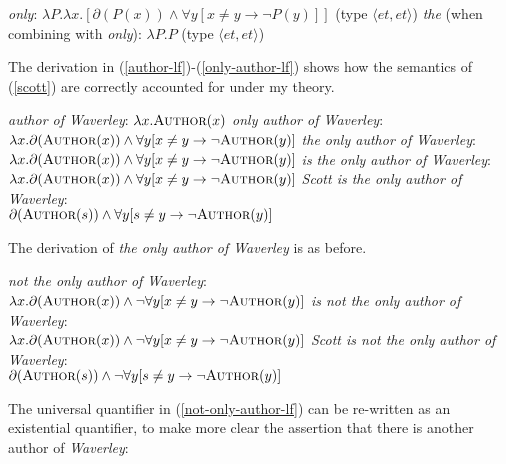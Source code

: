 \begin{exe}
	\ex \label{only-lf} \textit{only}: $ \lambda P . \lambda x . [ \partial(P(x)) \land \forall y [ x \ne y \to \neg P(y) ] ] $ (type $\langle et, et \rangle$)
	\ex \textit{the} (when combining with \textit{only}): $\lambda P . P$ (type $\langle et, et \rangle$)
\end{exe}

The derivation in (\ref{author-lf})-(\ref{only-author-lf}) shows how the semantics of (\ref{scott}) are correctly accounted for under my theory.

\begin{exe}
	\ex \label{author-lf} \textit{author of Waverley}: $\lambda x . \textsc{Author}(x)$
	\ex \textit{only author of Waverley}: $\lambda x . \partial(\textsc{Author}(x)) \land \forall y [ x \ne y \to \neg \textsc{Author}(y) ]$
	\ex \textit{the only author of Waverley}: $\lambda x . \partial(\textsc{Author}(x)) \land \forall y [ x \ne y \to \neg \textsc{Author}(y) ]$
	\ex \textit{is the only author of Waverley}: $\lambda x . \partial(\textsc{Author}(x)) \land \forall y [ x \ne y \to \neg \textsc{Author}(y) ]$
	\ex \label{only-author-lf} \textit{Scott is the only author of Waverley}: \\ $\partial(\textsc{Author}(s)) \land \forall y [ s \ne y \to \neg \textsc{Author}(y) ]$
\end{exe}

The derivation of \textit{the only author of Waverley} is as before.

\begin{exe}
	\ex \textit{not the only author of Waverley}: \\ $\lambda x . \partial(\textsc{Author}(x)) \land \neg  \forall y [ x \ne y \to \neg \textsc{Author}(y) ]$
	\ex \textit{is not the only author of Waverley}: \\ $\lambda x . \partial(\textsc{Author}(x)) \land \neg  \forall y [ x \ne y \to \neg \textsc{Author}(y) ]$
	\ex \label{not-only-author-lf} \textit{Scott is not the only author of Waverley}: \\ $\partial(\textsc{Author}(s)) \land \neg \forall y [ s \ne y \to \neg \textsc{Author}(y) ]$
\end{exe}

The universal quantifier in (\ref{not-only-author-lf}) can be re-written as an existential quantifier, to make more clear the assertion that there is another author of \textit{Waverley}:


